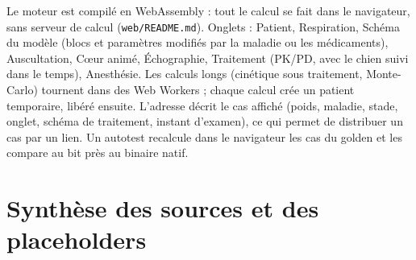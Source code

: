 \documentclass[10pt,a4paper]{article}
\newcommand{\cmd}[1]{\texttt{#1}}
\begin{document}
Le moteur est compilé en WebAssembly : tout le calcul se fait dans le navigateur, sans serveur de calcul (\cmd{web/README.md}). Onglets : Patient, Respiration, Schéma du modèle (blocs et paramètres modifiés par la maladie ou les médicaments), Auscultation, Cœur animé, Échographie, Traitement (PK/PD, avec le chien suivi dans le temps), Anesthésie. Les calculs longs (cinétique sous traitement, Monte-Carlo) tournent dans des Web Workers ; chaque calcul crée un patient temporaire, libéré ensuite. L'adresse décrit le cas affiché (poids, maladie, stade, onglet, schéma de traitement, instant d'examen), ce qui permet de distribuer un cas par un lien. Un autotest recalcule dans le navigateur les cas du golden et les compare au bit près au binaire natif.

\section{Synthèse des sources et des placeholders}\label{sec:synthese}
\end{document}
